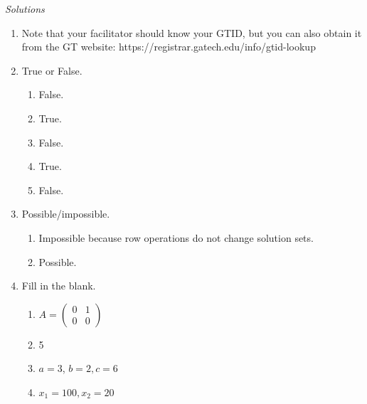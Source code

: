 \documentclass[12pt]{exam}
\begin{document}
\newpage
{\color{DarkBlue} \textit{Solutions} 
\begin{enumerate}
    \item Note that your facilitator should know your GTID, but you can also obtain it from the GT website: https://registrar.gatech.edu/info/gtid-lookup
    \item True or False. 
    \begin{enumerate}
        \item False.
        \item True.
        \item False.
        \item True. 
        \item False.
    \end{enumerate}
    \item Possible/impossible. 
    \begin{enumerate}
        \item Impossible because row operations do not change solution sets.
        \item Possible. 
    \end{enumerate}
    \item Fill in the blank.
    \begin{enumerate}
        \item $A = \begin{pmatrix} 0&1\\0&0 \end{pmatrix}$
    \item 5
    \item $a=3$, $b=2, c = 6$
    \item $x_1 = 100, x_2 = 20$
    \end{enumerate}
\end{enumerate}

} 
\end{document}
